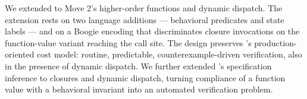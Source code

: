 
We extended \MVP to Move 2's higher-order functions and dynamic dispatch.
The extension rests on two language additions --- behavioral predicates and state labels --- and on a Boogie encoding that discriminates closure invocations on the function-value variant reaching the call site.
The design preserves \MVP's production-oriented cost model: routine, predictable, counterexample-driven verification, also in the presence of dynamic dispatch.
We further extended \MVP's specification inference to closures and dynamic dispatch, turning compliance of a function value with a behavioral invariant into an automated verification problem.

